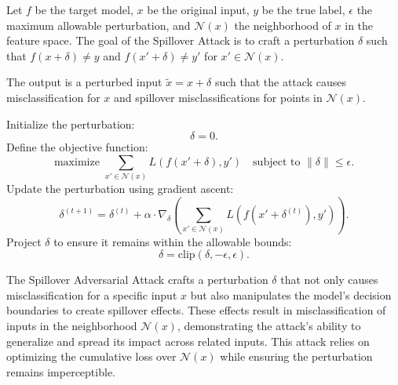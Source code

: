 Let \( f \) be the target model, \( x \) be the original input, \( y \) be the true label, \( \epsilon \) the maximum allowable perturbation, and \( \mathcal{N}(x) \) the neighborhood of \( x \) in the feature space. The goal of the Spillover Attack is to craft a perturbation \( \delta \) such that \( f(x + \delta) \neq y \) and \( f(x' + \delta) \neq y' \) for \( x' \in \mathcal{N}(x) \).

The output is a perturbed input \( \tilde{x} = x + \delta \) such that the attack causes misclassification for \( x \) and spillover misclassifications for points in \( \mathcal{N}(x) \).

Initialize the perturbation:
   \[
   \delta = 0.
   \]
Define the objective function:
   \[
   \text{maximize } \sum_{x' \in \mathcal{N}(x)} L(f(x' + \delta), y') \quad \text{subject to } \|\delta\| \leq \epsilon.
   \]
Update the perturbation using gradient ascent:
   \[
   \delta^{(t+1)} = \delta^{(t)} + \alpha \cdot \nabla_{\delta} \left( \sum_{x' \in \mathcal{N}(x)} L(f(x' + \delta^{(t)}), y') \right).
   \]
Project \( \delta \) to ensure it remains within the allowable bounds:
\[
   \delta = \text{clip}(\delta, -\epsilon, \epsilon).\]

The Spillover Adversarial Attack crafts a perturbation \( \delta \) that not only causes misclassification for a specific input \( x \) but also manipulates the model's decision boundaries to create spillover effects. These effects result in misclassification of inputs in the neighborhood \( \mathcal{N}(x) \), demonstrating the attack's ability to generalize and spread its impact across related inputs. This attack relies on optimizing the cumulative loss over \( \mathcal{N}(x) \) while ensuring the perturbation remains imperceptible.
